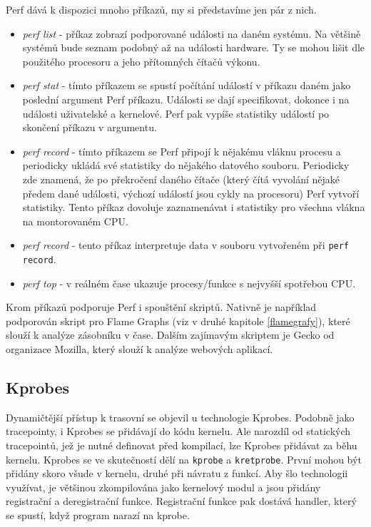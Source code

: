 Perf dává k dispozici mnoho příkazů, my si představíme jen pár z nich.
\begin{itemize}
    \item \emph{perf list} - příkaz zobrazí podporované události na daném systému. Na většině systémů bude seznam podobný až na události hardware. Ty se mohou lišit dle použitého procesoru a jeho přítomných čítačů výkonu.
    \item \emph{perf stat} - tímto příkazem se spustí počítání událostí v příkazu daném jako poslední argument Perf příkazu. Události se dají specifikovat, dokonce i na události uživatelské a kernelové. Perf pak vypíše statistiky událostí po skončení příkazu v argumentu.
    \item \emph{perf record} - tímto příkazem se Perf připojí k nějakému vláknu procesu a periodicky ukládá své statistiky do nějakého datového souboru. Periodicky zde znamená, že po překročení daného čítače (který čítá vyvolání nějaké předem dané události, výchozí událostí jsou cykly na procesoru) Perf vytvoří statistiky. Tento příkaz dovoluje zaznamenávat i statistiky pro všechna vlákna na montorovaném CPU.
    \item \emph{perf record} - tento příkaz interpretuje data v souboru vytvořeném při \texttt{perf record}.
    \item \emph{perf top} - v reálném čase ukazuje procesy/funkce s nejvyšší spotřebou CPU.
\end{itemize}

Krom příkazů podporuje Perf i spouštění skriptů. Nativně je například podporován skript pro Flame Graphs (viz v druhé kapitole \ref{flamegrafy}), které slouží k analýze zásobníku v čase. Dalším zajímavým skriptem je Gecko od organizace Mozilla, který slouží k analýze webových aplikací.

\subsection{Kprobes}
\label{kprobování}

Dynamičtější přístup k trasovní se objevil u technologie Kprobes. Podobně jako tracepointy, i Kprobes se přidávají do kódu kernelu. Ale narozdíl od statických tracepointů, jež je nutné definovat před kompilací, lze Kprobes přidávat za běhu kernelu. Kprobes se ve skutečností dělí na \texttt{kprobe} a \texttt{kretprobe}. První mohou být přidány skoro všude v kernelu, druhé při návratu z funkcí. Aby šlo technologii využívat, je většinou zkompilována jako kernelový modul a jsou přidány registrační a deregistrační funkce. Registrační funkce pak dostává handler, který se spustí, když program narazí na kprobe.

